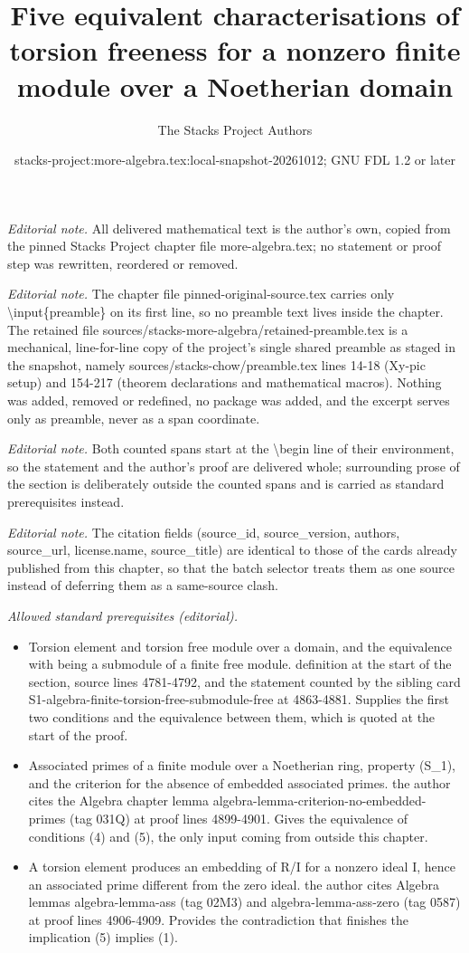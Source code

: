 \documentclass[10pt,a4paper]{amsart}
\title{Five equivalent characterisations of torsion freeness for a nonzero finite module over a Noetherian domain}
\author{The Stacks Project Authors}
\date{stacks-project:more-algebra.tex:local-snapshot-20261012; GNU FDL 1.2 or later}
\theoremstyle{plain}
\theoremstyle{definition}
\theoremstyle{remark}
\numberwithin{equation}{subsection}
\begin{document}
\maketitle
\setcounter{subsection}{1}
\noindent\textit{Editorial note.} All delivered mathematical text is the author's own, copied from the pinned Stacks Project chapter file more-algebra.tex; no statement or proof step was rewritten, reordered or removed.\par\medskip
\noindent\textit{Editorial note.} The chapter file pinned-original-source.tex carries only \textbackslash{}input\{preamble\} on its first line, so no preamble text lives inside the chapter. The retained file sources/stacks-more-algebra/retained-preamble.tex is a mechanical, line-for-line copy of the project's single shared preamble as staged in the snapshot, namely sources/stacks-chow/preamble.tex lines 14-18 (Xy-pic setup) and 154-217 (theorem declarations and mathematical macros). Nothing was added, removed or redefined, no package was added, and the excerpt serves only as preamble, never as a span coordinate.\par\medskip
\noindent\textit{Editorial note.} Both counted spans start at the \textbackslash{}begin line of their environment, so the statement and the author's proof are delivered whole; surrounding prose of the section is deliberately outside the counted spans and is carried as standard prerequisites instead.\par\medskip
\noindent\textit{Editorial note.} The citation fields (source\_id, source\_version, authors, source\_url, license.name, source\_title) are identical to those of the cards already published from this chapter, so that the batch selector treats them as one source instead of deferring them as a same-source clash.\par\medskip
\noindent\textit{Allowed standard prerequisites (editorial).}\begin{itemize}
\item Torsion element and torsion free module over a domain, and the equivalence with being a submodule of a finite free module. definition at the start of the section, source lines 4781-4792, and the statement counted by the sibling card S1-algebra-finite-torsion-free-submodule-free at 4863-4881. Supplies the first two conditions and the equivalence between them, which is quoted at the start of the proof.
\item Associated primes of a finite module over a Noetherian ring, property (S\_1), and the criterion for the absence of embedded associated primes. the author cites the Algebra chapter lemma algebra-lemma-criterion-no-embedded-primes (tag 031Q) at proof lines 4899-4901. Gives the equivalence of conditions (4) and (5), the only input coming from outside this chapter.
\item A torsion element produces an embedding of R/I for a nonzero ideal I, hence an associated prime different from the zero ideal. the author cites Algebra lemmas algebra-lemma-ass (tag 02M3) and algebra-lemma-ass-zero (tag 0587) at proof lines 4906-4909. Provides the contradiction that finishes the implication (5) implies (1).
\end{itemize}\medskip
\end{document}
